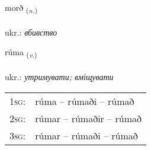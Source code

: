\documentclass[frontgrid, backgrid]{flacards}\usepackage[]{graphicx}\usepackage[]{xcolor}
\begin{document}
\renewcommand{\flhead}{\vskip5pt \fboxsep=0pt {\small\bfseries\footnotesize Nafnorð | іменник}}
\renewcommand{\fcfoot}{\vskip5pt \fboxsep=0pt \hspace{2pt}{\small\bfseries\footnotesize 3K}}

\renewcommand{\blhead}{\vskip5pt {\small\bfseries\footnotesize Nafnorð | іменник }}
\renewcommand{\bcfoot}{\vskip5pt \hspace{2pt}{\small\bfseries\footnotesize 3K}}


{morð \small{\textsubscript{(\textit{n.})}} \\[1ex] %
\textphonetic{[mɔrð]} \\
ukr.: \emph{вбивство} \\  [2ex]
\renewcommand*{\arraystretch}{0.8}
}

\renewcommand{\flhead}{\vskip5pt \fboxsep=0pt {\small\bfseries\footnotesize Sagnorð | дієслово}}
\renewcommand{\fcfoot}{\vskip5pt \fboxsep=0pt \hspace{2pt}{\small\bfseries\footnotesize 3K}}

\renewcommand{\blhead}{\vskip5pt {\small\bfseries\footnotesize Sagnorð | дієслово }}
\renewcommand{\bcfoot}{\vskip5pt \hspace{2pt}{\small\bfseries\footnotesize 3K}}


{rúma \small{\textsubscript{(\textit{v.})}} \\[1ex] %
\textphonetic{[ruːma]} \\
ukr.: \emph{утримувати; вміщувати} \\  [2ex]
\renewcommand*{\arraystretch}{0.8}
\begin{tabular}{p{1cm}l}
\textsc{1sg}: & rúma -- rúmaði -- rúmað \\ 
\textsc{2sg}: & rúmar -- rúmaðir -- rúmað \\ 
\textsc{3sg}: & rúmar -- rúmaði -- rúmað \\ 
\end{tabular}
}
\end{document}
